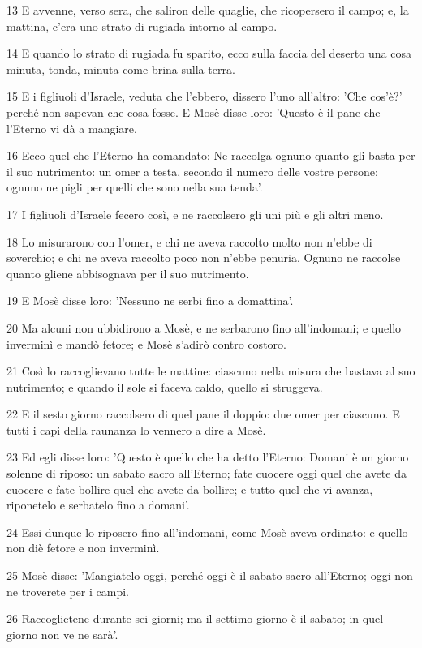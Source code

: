\par 13 E avvenne, verso sera, che saliron delle quaglie, che ricopersero il campo; e, la mattina, c'era uno strato di rugiada intorno al campo.
\par 14 E quando lo strato di rugiada fu sparito, ecco sulla faccia del deserto una cosa minuta, tonda, minuta come brina sulla terra.
\par 15 E i figliuoli d'Israele, veduta che l'ebbero, dissero l'uno all'altro: 'Che cos'è?' perché non sapevan che cosa fosse. E Mosè disse loro: 'Questo è il pane che l'Eterno vi dà a mangiare.
\par 16 Ecco quel che l'Eterno ha comandato: Ne raccolga ognuno quanto gli basta per il suo nutrimento: un omer a testa, secondo il numero delle vostre persone; ognuno ne pigli per quelli che sono nella sua tenda'.
\par 17 I figliuoli d'Israele fecero così, e ne raccolsero gli uni più e gli altri meno.
\par 18 Lo misurarono con l'omer, e chi ne aveva raccolto molto non n'ebbe di soverchio; e chi ne aveva raccolto poco non n'ebbe penuria. Ognuno ne raccolse quanto gliene abbisognava per il suo nutrimento.
\par 19 E Mosè disse loro: 'Nessuno ne serbi fino a domattina'.
\par 20 Ma alcuni non ubbidirono a Mosè, e ne serbarono fino all'indomani; e quello inverminì e mandò fetore; e Mosè s'adirò contro costoro.
\par 21 Così lo raccoglievano tutte le mattine: ciascuno nella misura che bastava al suo nutrimento; e quando il sole si faceva caldo, quello si struggeva.
\par 22 E il sesto giorno raccolsero di quel pane il doppio: due omer per ciascuno. E tutti i capi della raunanza lo vennero a dire a Mosè.
\par 23 Ed egli disse loro: 'Questo è quello che ha detto l'Eterno: Domani è un giorno solenne di riposo: un sabato sacro all'Eterno; fate cuocere oggi quel che avete da cuocere e fate bollire quel che avete da bollire; e tutto quel che vi avanza, riponetelo e serbatelo fino a domani'.
\par 24 Essi dunque lo riposero fino all'indomani, come Mosè aveva ordinato: e quello non diè fetore e non inverminì.
\par 25 Mosè disse: 'Mangiatelo oggi, perché oggi è il sabato sacro all'Eterno; oggi non ne troverete per i campi.
\par 26 Raccoglietene durante sei giorni; ma il settimo giorno è il sabato; in quel giorno non ve ne sarà'.
